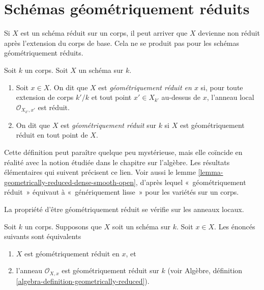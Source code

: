 \section{Schémas géométriquement réduits}
\label{section-geometrically-reduced}

\noindent
Si $X$ est un schéma réduit sur un corps, il peut arriver que
$X$ devienne non réduit après l'extension du corps de base.
Cela ne se produit pas pour les schémas géométriquement réduits.

\begin{definition}
\label{definition-geometrically-reduced}
Soit $k$ un corps.
Soit $X$ un schéma sur $k$.
\begin{enumerate}
\item Soit $x \in X$. On dit que $X$ est
{\it géométriquement réduit en $x$} si, pour toute
extension de corps $k'/k$ et tout point $x' \in X_{k'}$
au-dessus de $x$, l'anneau local $\mathcal{O}_{X_{k'}, x'}$
est réduit.
\item On dit que $X$ est {\it géométriquement réduit} sur $k$
si $X$ est géométriquement réduit en tout point de $X$.
\end{enumerate}
\end{definition}

\noindent
Cette définition peut paraître quelque peu mystérieuse, mais elle
coïncide en réalité avec la notion étudiée dans le chapitre sur
l'algèbre. Les résultats élémentaires qui suivent précisent ce lien.
Voir aussi le lemme
\ref{lemma-geometrically-reduced-dense-smooth-open}, d'après lequel
«~géométriquement réduit~» équivaut à «~génériquement lisse~» pour les variétés sur un corps.

\begin{lemma}
\label{lemma-geometrically-reduced-at-point}
\begin{slogan}
La propriété d'être géométriquement réduit se vérifie sur les anneaux locaux.
\end{slogan}
Soit $k$ un corps.
Supposons que $X$ soit un schéma
sur $k$. Soit $x \in X$. Les
énoncés suivants sont équivalents
\begin{enumerate}
\item $X$ est géométriquement réduit en $x$, et
\item l’anneau $\mathcal{O}_{X, x}$ est
géométriquement réduit sur $k$ (voir Algèbre,
définition \ref{algebra-definition-geometrically-reduced}).
\end{enumerate}
\end{lemma}

